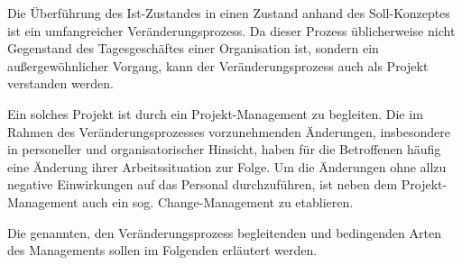Die Überführung des Ist-Zustandes in einen Zustand anhand des Soll-Konzeptes ist ein umfangreicher Veränderungsprozess. Da dieser Prozess üblicherweise nicht Gegenstand des Tagesgeschäftes einer Organisation ist, sondern ein außergewöhnlicher Vorgang, kann der Veränderungsprozess auch als Projekt verstanden werden. 

\par Ein solches Projekt ist durch ein Projekt-Management zu begleiten. Die im Rahmen des Veränderungsprozesses vorzunehmenden Änderungen, insbesondere in personeller und organisatorischer Hinsicht, haben für die Betroffenen häufig eine Änderung ihrer Arbeitssituation zur Folge. Um die Änderungen ohne allzu negative Einwirkungen auf das Personal durchzuführen, ist neben dem Projekt-Management auch ein sog. Change-Management zu etablieren.

\par Die genannten, den Veränderungsprozess begleitenden und bedingenden Arten des Managements sollen im Folgenden erläutert werden.